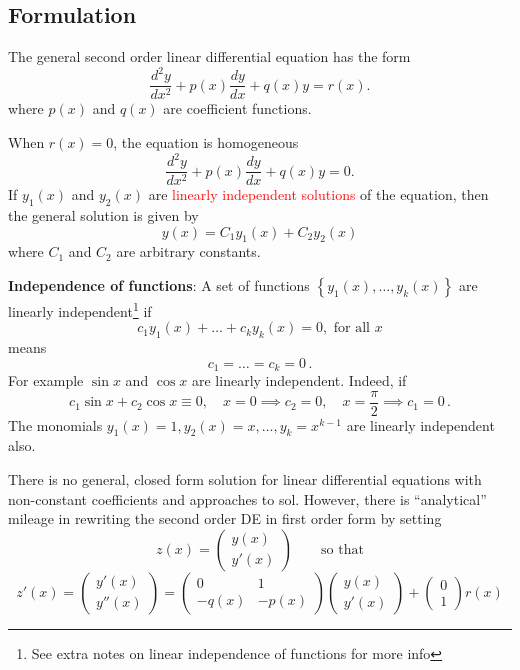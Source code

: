 \documentclass{article}
\begin{document}
\subsection{Formulation}
 
The general second order linear differential equation has the form
$$
\frac{d^2 y}{dx^2} + p(x) \frac{dy}{dx} + q(x) y = r(x).
$$
where $p(x)$ and $q(x)$ are coefficient functions.

When $r(x)=0$, the equation is homogeneous
$$
\frac{d^2 y}{dx^2} + p(x) \frac{dy}{dx} + q(x) y = 0.
$$
If $y_1(x)$ and $y_2(x)$ are \textcolor{red}{linearly independent solutions} of the equation, 
then the general solution is given by
$$
y(x)=C_1 y_1(x) + C_2 y_2(x)
$$
where $C_1$ and $C_2$ are arbitrary constants. 



\textbf{Independence of functions}: A set of functions $\left\{ y_1 (x), \ldots, y_k (x) \right\}$ are linearly independent\footnote{See extra notes on linear independence of functions for more info}
if
$$
c_1 y_1(x) + \ldots + c_k y_k (x) = 0, \mbox{ for all } x
$$
means 
$$
c_1 = \ldots = c_k = 0\,.
$$
For example $\sin x$ and $\cos x$ are linearly independent. Indeed, if
$$
c_1 \sin x + c_2 \cos x \equiv 0, \quad x = 0 \implies c_2 = 0, \quad x = \frac{\pi}{2} \implies c_1 = 0\,.
$$ 
The monomials $y_1 (x) = 1, y_2 (x) = x, \ldots , y_k = x^{k-1}$ are linearly independent also.

There is no general, closed form solution for linear differential equations with 
non-constant coefficients and approaches to sol. However, there is ``analytical'' mileage in rewriting the second
order DE in first order form by setting
$$
z(x) = \left( \begin{array}{l} y(x) \\ y'(x) \end{array} \right) \qquad \mbox{so that}
$$
{\small
$$
z'(x) = \left( \begin{array}{l} y'(x) \\ y''(x) \end{array} \right) = \left( \begin{array}{cc} 0 & 1 \\ -q(x) & -p(x) \end{array} \right) \left( \begin{array}{l} y(x) \\ y'(x) \end{array} \right) + \left( \begin{array}{l} 0 \\ 1 \end{array} \right) r(x)
$$
}
\end{document}
